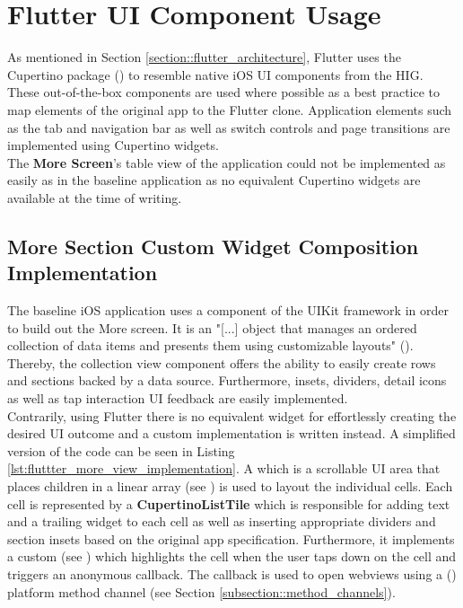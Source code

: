 \section{Flutter UI Component Usage} \label{section::flutter_ui_component_usage}
As mentioned in Section \ref{section::flutter_architecture}, Flutter uses the Cupertino package (\cite{CupertinoPackageDocumentation2021}) to resemble native iOS UI components from the HIG.
These out-of-the-box components are used where possible as a best practice to map elements of the original app to the Flutter clone. 
Application elements such as the tab and navigation bar as well as switch controls and page transitions are implemented using Cupertino widgets.\\
The \textbf{More Screen}'s table view of the application could not be implemented as easily as in the baseline application as no equivalent Cupertino widgets are available at the time of writing.

\subsection{More Section Custom Widget Composition Implementation}
The baseline iOS application uses a  component of the UIKit framework in order to build out the More screen.
It is an "[...] object that manages an ordered collection of data items and presents them using customizable layouts" (\cite{UICollectionView2021}).
Thereby, the collection view component offers the ability to easily create rows and sections backed by a data source. 
Furthermore, insets, dividers, detail icons as well as tap interaction UI feedback are easily implemented.\\
Contrarily, using Flutter there is no equivalent widget for effortlessly creating the desired UI outcome and a custom implementation is written instead.
A simplified version of the code can be seen in Listing \ref{lst:fluttter_more_view_implementation}.
A  which is a scrollable UI area that places children in a linear array (see \cite{SliverList2021}) is used to layout the individual cells.
Each cell is represented by a \textbf{CupertinoListTile} which is responsible for adding text and a trailing widget to each cell as well as inserting appropriate dividers and section insets based on the original app specification.
Furthermore, it implements a custom  (see \cite{GestureDetector2021}) which highlights the cell when the user taps down on the cell and triggers an anonymous callback.
The callback is used to open webviews using a  (\cite{SFSafariViewController2021}) platform method channel (see Section \ref{subsection::method_channels}).



